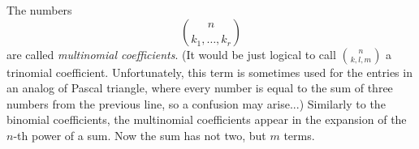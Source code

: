 

\setcounter{section}{4}
\setcounter{subsection}{2}
\setcounter{dfn}{1}

The numbers
\[
\binom{n}{k_1, \ldots, k_r}
\]
are called \emph{multinomial coefficients}.
(It would be just logical to call $\binom{n}{k, l, m}$ a trinomial coefficient.
Unfortunately, this term is sometimes used for the entries in an analog of Pascal triangle,
where every number is equal to the sum of three numbers from the previous line, so a confusion may arise...)
Similarly to the binomial coefficients, the multinomial coefficients appear in the expansion of the $n$-th power of a sum.
Now the sum has not two, but $m$ terms.



